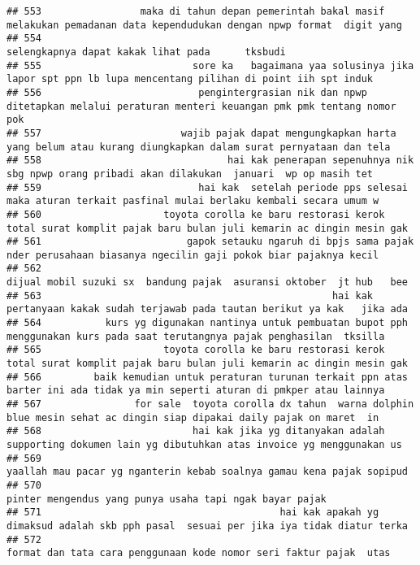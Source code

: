 \documentclass[
]{article}
\begin{document}
\begin{verbatim}
## 553                 maka di tahun depan pemerintah bakal masif melakukan pemadanan data kependudukan dengan npwp format  digit yang 
## 554                                                                                 selengkapnya dapat kakak lihat pada      tksbudi
## 555                          sore ka   bagaimana yaa solusinya jika lapor spt ppn lb lupa mencentang pilihan di point iih spt induk 
## 556                           pengintergrasian nik dan npwp ditetapkan melalui peraturan menteri keuangan pmk pmk tentang nomor pok 
## 557                        wajib pajak dapat mengungkapkan harta yang belum atau kurang diungkapkan dalam surat pernyataan dan tela 
## 558                                hai kak penerapan sepenuhnya nik sbg npwp orang pribadi akan dilakukan  januari  wp op masih tet 
## 559                           hai kak  setelah periode pps selesai maka aturan terkait pasfinal mulai berlaku kembali secara umum w 
## 560                     toyota corolla ke baru restorasi kerok total surat komplit pajak baru bulan juli kemarin ac dingin mesin gak
## 561                         gapok setauku ngaruh di bpjs sama pajak nder perusahaan biasanya ngecilin gaji pokok biar pajaknya kecil
## 562                                                           dijual mobil suzuki sx  bandung pajak  asuransi oktober  jt hub   bee 
## 563                                                  hai kak pertanyaan kakak sudah terjawab pada tautan berikut ya kak   jika ada  
## 564           kurs yg digunakan nantinya untuk pembuatan bupot pph menggunakan kurs pada saat terutangnya pajak penghasilan  tksilla
## 565                     toyota corolla ke baru restorasi kerok total surat komplit pajak baru bulan juli kemarin ac dingin mesin gak
## 566         baik kemudian untuk peraturan turunan terkait ppn atas barter ini ada tidak ya min seperti aturan di pmkper atau lainnya
## 567                for sale  toyota corolla dx tahun  warna dolphin blue mesin sehat ac dingin siap dipakai daily pajak on maret  in
## 568                          hai kak jika yg ditanyakan adalah supporting dokumen lain yg dibutuhkan atas invoice yg menggunakan us 
## 569                                                            yaallah mau pacar yg nganterin kebab soalnya gamau kena pajak sopipud
## 570                                                                         pinter mengendus yang punya usaha tapi ngak bayar pajak 
## 571                                         hai kak apakah yg dimaksud adalah skb pph pasal  sesuai per jika iya tidak diatur terka 
## 572                                                              format dan tata cara penggunaan kode nomor seri faktur pajak  utas 

\end{verbatim}
\end{document}
